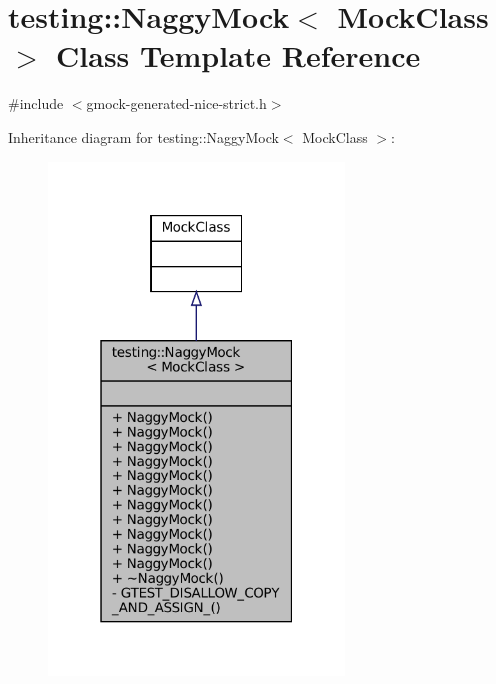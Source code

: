 \hypertarget{classtesting_1_1NaggyMock}{}\section{testing\+:\+:Naggy\+Mock$<$ Mock\+Class $>$ Class Template Reference}
\label{classtesting_1_1NaggyMock}


{\ttfamily \#include $<$gmock-\/generated-\/nice-\/strict.\+h$>$}



Inheritance diagram for testing\+:\+:Naggy\+Mock$<$ Mock\+Class $>$\+:
\nopagebreak
\begin{figure}[H]
\begin{center}
\leavevmode
\includegraphics[width=223pt]{classtesting_1_1NaggyMock__inherit__graph}
\end{center}
\end{figure}


